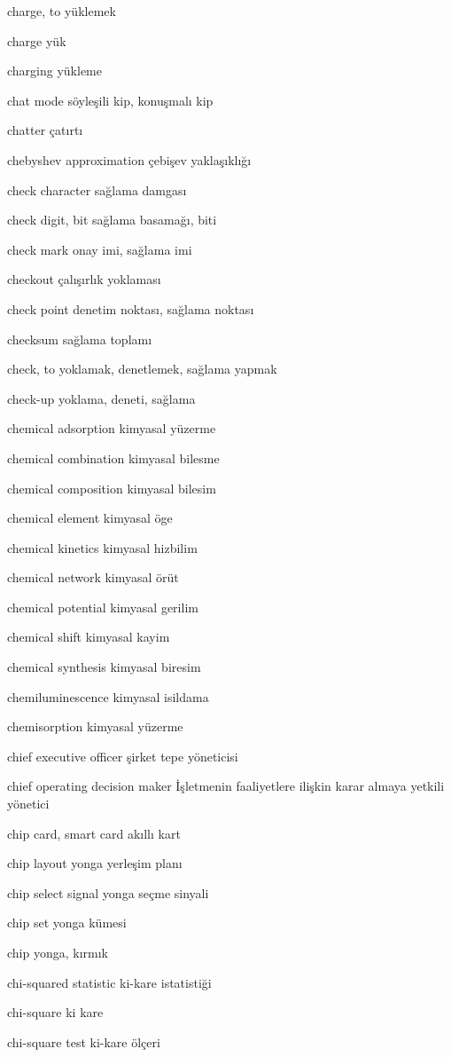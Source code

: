 \documentclass[12pt,fleqn]{article}\usepackage{../../common}
\begin{document}
charge, to yüklemek

charge yük

charging yükleme

chat mode söyleşili kip, konuşmalı kip

chatter çatırtı

chebyshev approximation çebişev yaklaşıklığı

check character sağlama damgası

check digit, bit sağlama basamağı, biti

check mark onay imi, sağlama imi

checkout çalışırlık yoklaması

check point denetim noktası, sağlama noktası

checksum sağlama toplamı

check, to yoklamak, denetlemek, sağlama yapmak

check-up yoklama, deneti, sağlama

chemical adsorption kimyasal yüzerme

chemical combination kimyasal bilesme

chemical composition kimyasal bilesim

chemical element kimyasal öge

chemical kinetics kimyasal hizbilim

chemical network kimyasal örüt

chemical potential kimyasal gerilim

chemical shift kimyasal kayim

chemical synthesis kimyasal biresim

chemiluminescence kimyasal isildama

chemisorption kimyasal yüzerme

chief executive officer şirket tepe yöneticisi

chief operating decision maker İşletmenin faaliyetlere ilişkin karar almaya yetkili yönetici

chip card, smart card akıllı kart

chip layout yonga yerleşim planı

chip select signal yonga seçme sinyali

chip set yonga kümesi

chip yonga, kırmık

chi-squared statistic ki-kare istatistiği

chi-square ki kare

chi-square test ki-kare ölçeri
\end{document}
